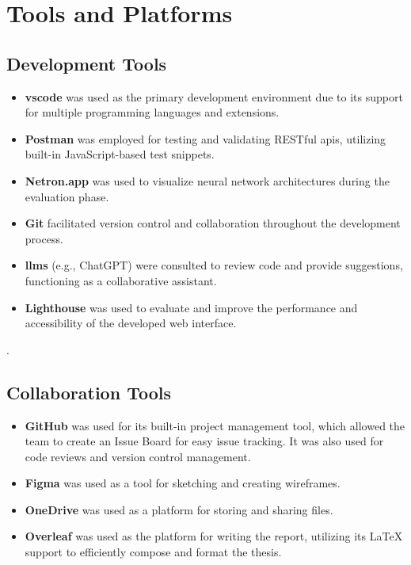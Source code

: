 \section{Tools and Platforms}
\label{sec:tools-and-platforms}

\subsection*{Development Tools}
\label{subsec:development-tools}

\begin{itemize}
    \item \textbf{\gls{vscode}} was used as the primary development environment due to its support for multiple programming languages and extensions.
\item \textbf{Postman} was employed for testing and validating RESTful \glspl{api}, utilizing built-in JavaScript-based test snippets.
\item \textbf{Netron.app} was used to visualize neural network architectures during the evaluation phase.
\item \textbf{Git} facilitated version control and collaboration throughout the development process.
\item \textbf{\glspl{llm}} (e.g., ChatGPT) were consulted to review code and provide suggestions, functioning as a collaborative assistant.
\item \textbf{Lighthouse} was used to evaluate and improve the performance and accessibility of the developed web interface.
\end{itemize}.

\subsection*{Collaboration Tools}
\label{subsec:collaboration-and-design-tools}

\begin{itemize}
    \item \textbf{GitHub} was used for its built-in project management tool, which allowed the team to create an Issue Board for easy issue tracking. It was also used for code reviews and version control management.
    
    \item \textbf{Figma} was used as a tool for sketching and creating wireframes.
    
    \item \textbf{OneDrive} was used as a platform for storing and sharing files.
    
    \item \textbf{Overleaf} was used as the platform for writing the report, utilizing its LaTeX support to efficiently compose and format the thesis.
\end{itemize}


